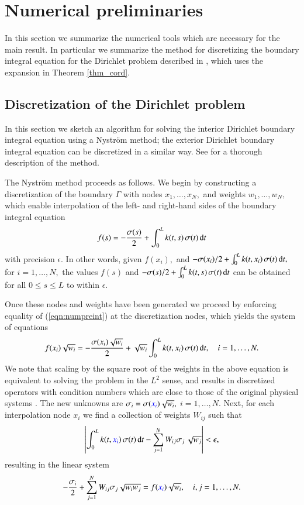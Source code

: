 
\section{Numerical preliminaries \label{sec:nprelim}}
In this section we summarize the numerical tools which are necessary for the main result. In particular we summarize the method for discretizing the boundary integral equation for the Dirichlet problem described in \cite{hoskins2019numerical}, which uses the expansion in Theorem \ref{thm_cord}.
\subsection{Discretization of the Dirichlet problem}\label{sec:disc_dir}
In this section we sketch an algorithm for solving the interior Dirichlet boundary integral equation using a Nystr\"{o}m method; the exterior Dirichlet boundary integral equation can be discretized in a similar way. See \cite{hoskins2019numerical} for a thorough description of the method. 

The Nystr\"{o}m method proceeds as follows. We begin by constructing a discretization of the boundary $\Gamma$ with nodes {\color{blue}$x_1,\dots,x_N,$} and weights $w_1,\dots,w_N,$ which enable interpolation of the left- and right-hand sides of the boundary integral equation
\begin{align}\label{eqn:numpreint}
f(s) = -\frac{\sigma(s)}{2} + \int_0^L k(t,s) \,\sigma(t)\, {\rm d} t
\end{align}
with precision $\epsilon.$ In other words, given {\color{blue}$f(x_i),$ and $-\sigma(x_i)/2 + \int_0^L k(t,x_i) \,\sigma(t)\, {\rm d} t,$} for $i=1,\dots,N,$ the values $f(s)$ and $-\sigma(s)/2 + \int_0^L k(t,s) \,\sigma(t)\, {\rm d} t$ can be obtained for all $0 \le s \le L$ to within $\epsilon.$

Once these nodes and weights have been generated we proceed by enforcing equality of (\ref{eqn:numpreint}) at the discretization nodes, which yields the system of equations
{\color{blue}
\begin{align}
f(x_i) \sqrt{w_i} = -\frac{\sigma(x_i)\sqrt{w_i}}{2} +  \sqrt{w_i}\int_0^L k(t,x_i)\, \sigma(t)\,{\rm d}t,\quad i=1,\dots,N. \label{eqn_1std}
\end{align}
}
We note that scaling by the square root of the weights in the above equation is equivalent to solving the problem in the $L^2$ sense, and results in discretized operators with condition numbers which are close to those of the original physical systems \cite{bremer3}. The new unknowns are $\sigma_i = \sigma({\color{blue}x_i}) \sqrt{w_i},$ $i=1,\dots,N.$ Next, for each interpolation node {\color{blue}$x_i$} we find a collection of weights $W_{ij}$ such that
\begin{align}
\left|\int_0^L k(t,{\color{blue}x_i})\, \sigma(t)\,{\rm d}t- \sum_{j=1}^N W_{ij} \sigma_j\, \sqrt{w_j} \right| < \epsilon,
\end{align}
resulting in the linear system
\begin{align}
  -\frac{\sigma_i}{2} +  \sum_{j=1}^N W_{ij} \sigma_j \sqrt{w_i w_j}=f({\color{blue}x_i}) \sqrt{w_i},\quad i,j=1,\dots,N. 
\end{align}

